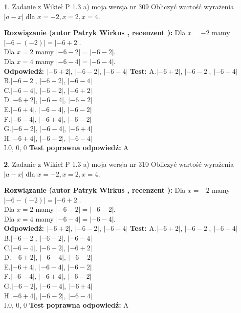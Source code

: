 \documentclass[12pt, a4paper]{article}
\theoremstyle{definition} %
\newtheorem{zad}{}
\newcommand{\zadStart}[1]{\begin{zad}#1\newline}
\newcommand{\zadStop}{\end{zad}}
\newcommand{\rozwStart}[2]{\noindent \textbf{Rozwiązanie (autor #1 , recenzent #2): }\newline}
\newcommand{\rozwStop}{\newline}
\newcommand{\odpStart}{\noindent \textbf{Odpowiedź:}\newline}
\newcommand{\odpStop}{\newline}
\newcommand{\testStart}{\noindent \textbf{Test:}\newline}
\newcommand{\testStop}{\newline}
\newcommand{\kluczStart}{\noindent \textbf{Test poprawna odpowiedź:}\newline}
\newcommand{\kluczStop}{\newline}
\begin{document}
\zadStart{Zadanie z Wikieł P 1.3 a) moja wersja nr 309}
Obliczyć wartość wyrażenia $|a - x|$ dla $x=-2,x=2,x=4$.
\zadStop
\rozwStart{Patryk Wirkus}{}
Dla $x = -2$ mamy $|-6 - (-2)| = |-6 + 2|$.\\
Dla $x = 2$ mamy $|-6 - 2| = |-6 - 2|$.\\
Dla $x = 4$ mamy $|-6 - 4| = |-6 - 4|$.\\
\rozwStop
\odpStart
$|-6 + 2|$, $|-6 - 2|$, $|-6 - 4|$
\odpStop
\testStart
A.$|-6 + 2|$, $|-6 - 2|$, $|-6 - 4|$\\
B.$|-6 - 2|$, $|-6 + 2|$, $|-6 - 4|$\\
C.$|-6 - 4|$, $|-6 - 2|$, $|-6 + 2|$\\
D.$|-6 + 2|$, $|-6 - 4|$, $|-6 - 2|$\\
E.$|-6 + 4|$, $|-6 - 4|$, $|-6 - 2|$\\
F.$|-6 - 4|$, $|-6 + 4|$, $|-6 - 2|$\\
G.$|-6 - 2|$, $|-6 - 4|$, $|-6 + 4|$\\
H.$|-6 + 4|$, $|-6 - 2|$, $|-6 - 4|$\\
I.$0$, $0$, $0$
\testStop
\kluczStart
A
\kluczStop



\zadStart{Zadanie z Wikieł P 1.3 a) moja wersja nr 310}
Obliczyć wartość wyrażenia $|a - x|$ dla $x=-2,x=2,x=4$.
\zadStop
\rozwStart{Patryk Wirkus}{}
Dla $x = -2$ mamy $|-6 - (-2)| = |-6 + 2|$.\\
Dla $x = 2$ mamy $|-6 - 2| = |-6 - 2|$.\\
Dla $x = 4$ mamy $|-6 - 4| = |-6 - 4|$.\\
\rozwStop
\odpStart
$|-6 + 2|$, $|-6 - 2|$, $|-6 - 4|$
\odpStop
\testStart
A.$|-6 + 2|$, $|-6 - 2|$, $|-6 - 4|$\\
B.$|-6 - 2|$, $|-6 + 2|$, $|-6 - 4|$\\
C.$|-6 - 4|$, $|-6 - 2|$, $|-6 + 2|$\\
D.$|-6 + 2|$, $|-6 - 4|$, $|-6 - 2|$\\
E.$|-6 + 4|$, $|-6 - 4|$, $|-6 - 2|$\\
F.$|-6 - 4|$, $|-6 + 4|$, $|-6 - 2|$\\
G.$|-6 - 2|$, $|-6 - 4|$, $|-6 + 4|$\\
H.$|-6 + 4|$, $|-6 - 2|$, $|-6 - 4|$\\
I.$0$, $0$, $0$
\testStop
\kluczStart
A
\kluczStop
\end{document}

